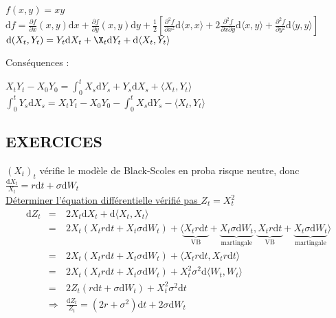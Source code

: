 \documentclass{report}
\begin{document}
$f(x,y)=xy$\\
$\mathrm{d}f = \displaystyle\frac{\partial f}{\partial x}(x, y)\mathrm{d}x + \displaystyle\frac{\partial f}{\partial y}(x, y)\mathrm{d}y + \displaystyle\frac{1}{2}\left[\displaystyle\frac{\partial^2f}{\partial x^2}\mathrm{d}\langle x,x\rangle + 2\displaystyle\frac{\partial^2f}{\partial x\partial y}\mathrm{d}\langle x,y\rangle + \displaystyle\frac{\partial^2f}{\partial y^2}\mathrm{d}\langle y,y\rangle\right]$\\
$\mathrm{d}(X_t, Y_t) = Y_t\mathrm{d}X_t+\X_t\mathrm{d}Y_t + \mathrm{d}\langle X_t, Y_t\rangle$

\vspace{0.3cm}
Conséquences  :
\begin{center}
    $X_tY_t-X_0Y_0 = \int^t_0X_s\mathrm{d}Y_s+Y_s\mathrm{d}X_s+\langle X_t,Y_t\rangle$\\
    $\int^t_0Y_s\mathrm{d}X_s = X_tY_t-X_0Y_0-\int_0^tX_s\mathrm{d}Y_s - \langle X_t, Y_t\rangle$
\end{center}


\subsection{EXERCICES}

$(X_t)_t$ vérifie le modèle de Black-Scoles en proba risque neutre, donc $\displaystyle\frac{\mathrm{d}X_t}{X_t}=r\mathrm{d}t+\sigma\mathrm{d}W_t$\\

\vspace{0.3cm}
\underline{Déterminer l'équation différentielle vérifié pas $Z_t = X^2_t$}
\begin{eqnarray}
\mathrm{d}Z_t&=&2X_t\mathrm{d}X_t+\mathrm{d}\langle X_t, X_t\rangle\nonumber\\
&=& 2X_t(X_tr\mathrm{d}t+X_t\sigma\mathrm{d}W_t)+\langle \underbrace{X_tr\mathrm{d}t}_{\mbox{VB}}+\underbrace{X_t\sigma\mathrm{d}W_t}_{\mbox{martingale}},\underbrace{X_tr\mathrm{d}t}_{\mbox{VB}}+\underbrace{X_t\sigma\mathrm{d}W_t}_{\mbox{martingale}}\rangle\nonumber\\
&=& 2X_t(X_tr\mathrm{d}t+X_t\sigma\mathrm{d}W_t)+\langle X_tr\mathrm{d}t,X_tr\mathrm{d}t\rangle\nonumber\\
&=& 2X_t(X_tr\mathrm{d}t+X_t\sigma\mathrm{d}W_t)+X_t^2\sigma^2\mathrm{d}\langle W_t,W_t\rangle\nonumber\\
&=& 2Z_t(r\mathrm{d}t+\sigma\mathrm{d}W_t)+X_t^2\sigma^2\mathrm{d}t\nonumber\\
&\Rightarrow& \displaystyle\frac{\mathrm{d}Z_t}{Z_t}=(2r+\sigma^2)\mathrm{d}t+2\sigma\mathrm{d}W_t\nonumber
\end{eqnarray}
\end{document}
